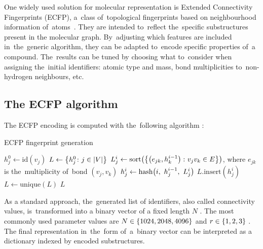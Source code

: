 One widely used solution for molecular representation is Extended Connectivity Fingerprints (ECFP), a~class of~topological fingerprints based on neighbourhood information of~atoms~\cite{rogers2010ecfp}. They are intended to~reflect the~specific substructures present in the molecular graph. By~adjusting which features are included in~the~generic algorithm, they can be adapted to~encode specific properties of~a compound. The~results can be tuned by choosing what to~consider when assigning the~initial identifiers: atomic type and mass, bond multiplicities to~non-hydrogen neighbours, etc.

\subsection{The ECFP algorithm}
The ECFP encoding is computed with the~following algorithm \cite{rogers2010ecfp}:
\begin{algorithm}[H]
    \caption{ECFP fingerprint generation}
    \label{alg:ecfp}
    \begin{algorithmic}[1]
        \State \( h_j^0 \gets \text{id}(v_j) \)
        \EndFor
        \State \( L \gets \left\{ h_j^0 \colon j \in \left| V \right| \right\} \)
        \State \( L_j^i \gets \text{sort}\!\left( \left\{ \left( e_{jk}, h_k^{i-1} \right) \colon v_jv_k \in E \right\} \right) \), where \( e_{jk} \) is the~multiplicity of~bond \( (v_j, v_k) \)
        \State \( h_j^i \gets \text{hash}\!\pars{i, \ h_j^{i-1}, \ L_j^i} \)
        \State \( L.\text{insert}(h_j^i) \)
        \EndFor
        \State \( L \gets \text{unique}(L) \)
        \State \Return \( L \)
    \end{algorithmic}
\end{algorithm}

As a standard approach, the~generated list of identifiers, also called connectivity values, is~transformed into a binary vector of a fixed length \( N \) \cite{leach2007chemoinformatics}. The most commonly used parameter values are \( N \in \left\{ 1024, 2048, 4096 \right\} \) and \( r \in \left\{ 1, 2, 3 \right\} \) \cite{landrum2012fingerprints}. The final representation in~the~form of~a~binary vector can be interpreted as a dictionary indexed by encoded substructures.


